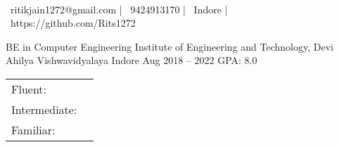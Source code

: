\documentclass[]{awesome-cv}
\begin{document}
    
\begin{center}
	  \\
	\vspace{2mm}
	{\faEnvelope\ ritikjain1272@gmail.com} | {\faMobile\ 9424913170} | {\faMapMarker\ Indore} | {\faLink\ https://github.com/Rits1272}
\end{center}
\begin{cventries}
	\cventry
	{BE in Computer Engineering}
	{Institute of Engineering and Technology, Devi Ahilya Vishwavidyalaya}
	{Indore}
	{Aug 2018 – 2022}
	{GPA: 8.0}
\end{cventries}

\vspace{-2mm}

\begin{cventries}
	\cventry
	{}
	{\def\arraystretch{1.15}{\begin{tabular}{ l l }
		Fluent:  & {\skill{ React Native, Django}} \\
		Intermediate:  & {\skill{ React, Machine Learning, Deep Learning, Git, Unix}} \\
		Familiar:  & {\skill{ IOT, Arduino}} \\
		\end{tabular}}}
	{}
	{}
	{}
\end{cventries}
\end{document}
